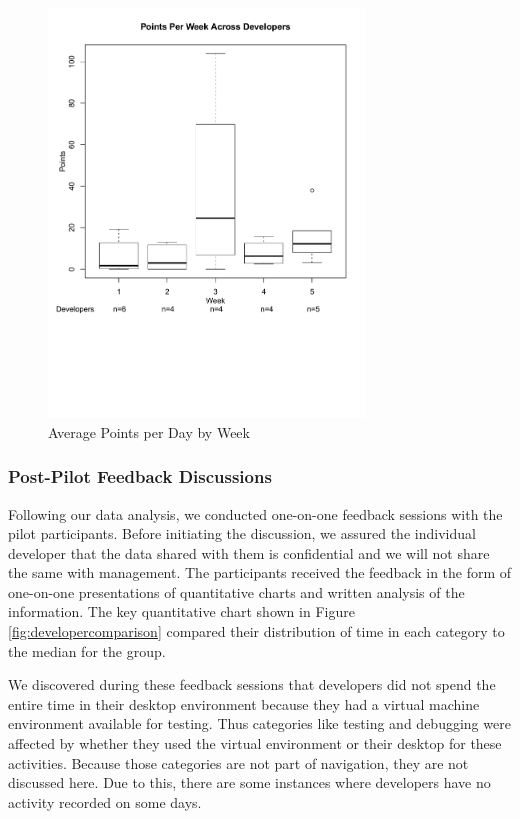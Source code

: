 \documentclass{sig-alternate}
\begin{document}
\begin{figure}
	\includegraphics[width=3.3in]{pointsbyweek_ann.pdf}
	\caption{Average Points per Day by Week}
	\label{fig:pointsbyweek}
\end{figure}

\subsubsection{Post-Pilot Feedback Discussions}

Following our data analysis, we conducted one-on-one feedback sessions with the pilot participants. Before initiating the discussion, we assured the individual developer that the data shared with them is confidential and we will not share the same with management. The participants received the feedback in the form of one-on-one presentations of quantitative charts and written analysis of the information.  The key quantitative chart shown in Figure \ref{fig:developercomparison} compared their distribution of time in each category to the median for the group.   

We discovered during these feedback sessions that developers did not spend the entire time in their desktop environment because they had a virtual machine environment available for testing. Thus categories like testing and debugging were affected by whether they used the virtual environment or their desktop for these activities.  Because those categories are not part of navigation, they are not discussed here. Due to this, there are some instances where developers have no activity recorded on some days.  
\end{document}
